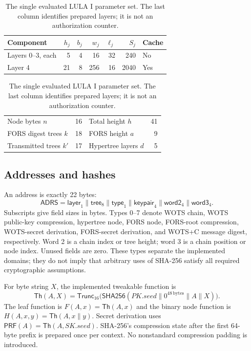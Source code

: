 \documentclass[a4paper,envcountsame,runningheads]{llncs}
\newcommand{\Hh}{\mathsf{SHA256}}
\newcommand{\Tr}{\mathsf{Trunc}_{16}}
\newcommand{\AD}{\mathsf{ADRS}}
\newcommand{\Th}{\mathsf{Th}}
\begin{document}
\begin{table}[t]
\caption{The single evaluated LULA I parameter set. The last column identifies prepared layers; it is not an authorization counter.}\label{tab:params}
\centering\small
\begin{tabular}{lrrrrrl}\toprule
Component & $h_j$ & $b_j$ & $w_j$ & $\ell_j$ & $S_j$ & Cache\\\midrule
Layers 0--3, each &5&4&16&32&240&No\\
Layer 4 &21&8&256&16&2040&Yes\\\bottomrule
\end{tabular}

\smallskip
\begin{tabular}{lr@{\quad}lr}\toprule
Node bytes $n$&16&Total height $h$&41\\
FORS digest trees $k$&18&FORS height $a$&9\\
Transmitted trees $k'$&17&Hypertree layers $d$&5\\\bottomrule
\end{tabular}
\end{table}

\subsection{Addresses and hashes}\label{sec:hash}
An address is exactly 22 bytes:
\[
 \AD=\mathsf{layer}_1\|\mathsf{tree}_8\|\mathsf{type}_1
       \|\mathsf{keypair}_4\|\mathsf{word2}_4\|\mathsf{word3}_4.
\]
Subscripts give field sizes in bytes. Types 0--7 denote WOTS chain, WOTS public-key compression, hypertree node, FORS node, FORS-root compression, WOTS-secret derivation, FORS-secret derivation, and WOTS+C message digest, respectively. Word 2 is a chain index or tree height; word 3 is a chain position or node index. Unused fields are zero. These types separate the implemented domains; they do not imply that arbitrary uses of SHA-256 satisfy all required cryptographic assumptions.

For byte string $X$, the implemented tweakable function is
\begin{equation}\label{eq:th}
 \Th(A,X)=\Tr\bigl(\Hh(PK.seed\|0^{48\,\mathrm{bytes}}\|A\|X)\bigr).
\end{equation}
The leaf function is $F(A,x)=\Th(A,x)$ and the binary node function is $H(A,x,y)=\Th(A,x\|y)$. Secret derivation uses $\mathsf{PRF}(A)=\Th(A,SK.seed)$. SHA-256's compression state after the first 64-byte prefix is prepared once per context. No nonstandard compression padding is introduced.
\end{document}
